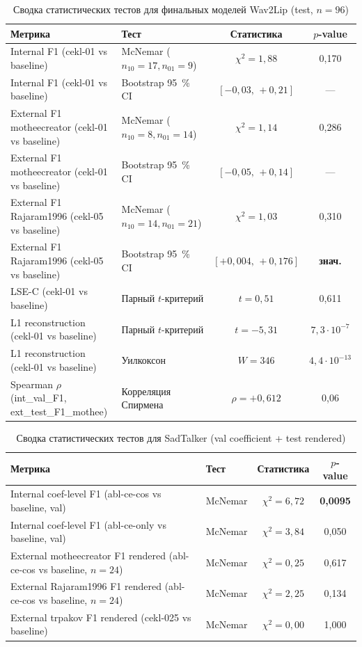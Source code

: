 \documentclass[a4paper, 12pt, oneside, openany]{article}
\begin{document}
\begin{table}[H]
\caption{Сводка статистических тестов для финальных моделей Wav2Lip (test, $n=96$)}
\label{tab:full_stats}
\centering
\small
\begin{tabular}{|p{3.5cm}|p{4cm}|c|c|}
\hline
\textbf{Метрика} & \textbf{Тест} & \textbf{Статистика} & $p$-value \\
\hline
Internal F1 (cekl-01 vs baseline) & McNemar ($n_{10}=17, n_{01}=9$) & $\chi^2 = 1{,}88$ & 0,170 \\
\hline
Internal F1 (cekl-01 vs baseline) & Bootstrap 95~\% CI & $[-0{,}03,\,+0{,}21]$ & --- \\
\hline
External F1 motheecreator (cekl-01 vs baseline) & McNemar ($n_{10}=8, n_{01}=14$) & $\chi^2 = 1{,}14$ & 0,286 \\
\hline
External F1 motheecreator (cekl-01 vs baseline) & Bootstrap 95~\% CI & $[-0{,}05,\,+0{,}14]$ & --- \\
\hline
External F1 Rajaram1996 (cekl-05 vs baseline) & McNemar ($n_{10}=14, n_{01}=21$) & $\chi^2 = 1{,}03$ & 0,310 \\
\hline
External F1 Rajaram1996 (cekl-05 vs baseline) & Bootstrap 95~\% CI & $[+0{,}004,\,+0{,}176]$ & \textbf{знач.} \\
\hline
LSE-C (cekl-01 vs baseline) & Парный $t$-критерий & $t = 0{,}51$ & 0,611 \\
\hline
L1 reconstruction (cekl-01 vs baseline) & Парный $t$-критерий & $t = -5{,}31$ & $7{,}3\!\cdot\!10^{-7}$ \\
\hline
L1 reconstruction (cekl-01 vs baseline) & Уилкоксон & $W = 346$ & $4{,}4\!\cdot\!10^{-13}$ \\
\hline
Spearman $\rho$ (int\_val\_F1, ext\_test\_F1\_mothee) & Корреляция Спирмена & $\rho = +0{,}612$ & 0,06 \\
\hline
\end{tabular}
\end{table}

\begin{table}[H]
\caption{Сводка статистических тестов для SadTalker (val coefficient + test rendered)}
\label{tab:full_stats_sad}
\centering
\small
\begin{tabular}{|p{3.5cm}|p{4cm}|c|c|}
\hline
\textbf{Метрика} & \textbf{Тест} & \textbf{Статистика} & $p$-value \\
\hline
Internal coef-level F1 (abl-ce-cos vs baseline, val) & McNemar & $\chi^2 = 6{,}72$ & \textbf{0,0095} \\
\hline
Internal coef-level F1 (abl-ce-only vs baseline, val) & McNemar & $\chi^2 = 3{,}84$ & 0,050 \\
\hline
External motheecreator F1 rendered (abl-ce-cos vs baseline, $n=24$) & McNemar & $\chi^2 = 0{,}25$ & 0,617 \\
\hline
External Rajaram1996 F1 rendered (abl-ce-cos vs baseline, $n=24$) & McNemar & $\chi^2 = 2{,}25$ & 0,134 \\
\hline
External trpakov F1 rendered (cekl-025 vs baseline) & McNemar & $\chi^2 = 0{,}00$ & 1,000 \\
\hline
\end{tabular}
\end{table}
\end{document}
